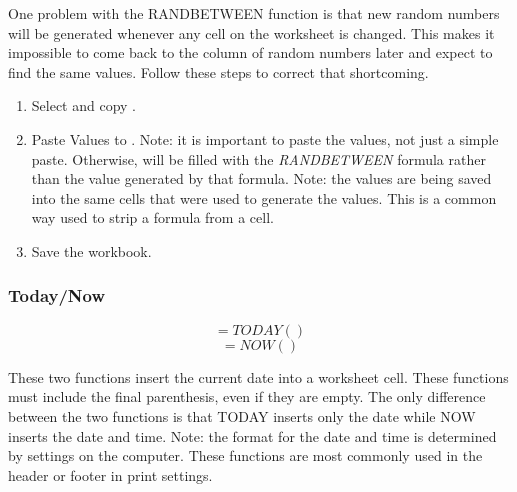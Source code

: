 One problem with the RANDBETWEEN function is that new random numbers will be generated whenever any cell on the worksheet is changed. This makes it impossible to come back to the column of random numbers later and expect to find the same values. Follow these steps to correct that shortcoming.

\begin{enumerate}[resume]
	\item Select and copy .
	\item Paste Values to . Note: it is important to paste the values, not just a simple paste. Otherwise,  will be filled with the \textit{RANDBETWEEN} formula rather than the value generated by that formula. Note: the values are being saved into the same cells that were used to generate the values. This is a common way used to strip a formula from a cell.
	\item Save the  workbook.
\end{enumerate}

\subsubsection{Today/Now}

\[ =TODAY() \]
\[ =NOW() \]

These two functions insert the current date into a worksheet cell. These functions must include the final parenthesis, even if they are empty. The only difference between the two functions is that TODAY inserts only the date while NOW inserts the date and time. Note: the format for the date and time is determined by settings on the computer. These functions are most commonly used in the header or footer in print settings.

